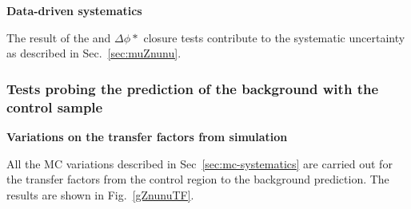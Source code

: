 {\bf Data-driven systematics}

The result of the \alphat and $\Delta\phi *$ closure tests contribute
to the systematic uncertainty as described in Sec.~\ref{sec:muZnunu}.

\subsubsection{Tests probing the prediction of the \znunu
background with the \gj control sample}

{\bf Variations on the transfer factors from simulation}

All the MC variations described in Sec~\ref{sec:mc-systematics} are
carried out for the transfer factors from the \gj control region to
the \znunu background prediction. The results are shown in
Fig.~\ref{gZnunuTF}.


